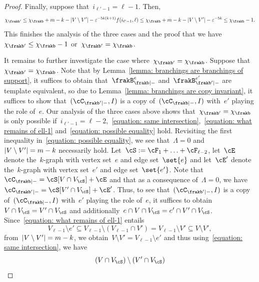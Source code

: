 \documentclass[11pt]{amsart}
\newcommand{\eps}{\varepsilon}
\DeclarePairedDelimiter{\abs}{\lvert}{\rvert}
\newcommand{\om}{\mathord{-}}
\theoremstyle{definition}
\numberwithin{equation}{section}
\begin{document}
\begin{proof}
		Finally, suppose that~$i_{\ell'-1}=\ell-1$.
		Then,
		\begin{equation*}
			\chi_{\frakb'}
			\leq \chi_{\frakb}+m-k-\abs{V\setminus V'}-\eps^{-5k(k+1)}f(i_{\ell'-1},\ell)
			\leq \chi_{\frakb}+m-k-\abs{V\setminus V'} -\eps^{-5k}
			\leq \chi_{\frakb}-1.
		\end{equation*}
		This finishes the analysis of the three cases and the proof that we have~$\chi_{\frakb'}\leq\chi_{\frakb}-1$ or~$\chi_{\frakb'}=\chi_{\frakb}$.
		
		It remains to further investigate the case where~$\chi_{\frakb'}=\chi_{\frakb}$.
		Suppose that~$\chi_{\frakb'}=\chi_{\frakb}$.
		Note that by Lemma~\ref{lemma: branchings are branchings of support}, it suffices to obtain that~$\frakB^e_{\frakb|\om}$ and~$\frakB^{e'}_{\frakb'|\om}$ are template equivalent, so due to Lemma~\ref{lemma: branchings are copy invariant}, it suffices to show that~$(\cC_{\frakb'|\om},I)$ is a copy of~$(\cC_{\frakb|\om},I)$ with~$e'$ playing the role of~$e$.
		Our analysis of the three cases above shows that~$\chi_{\frakb'}=\chi_{\frakb}$ is only possible if~$i_{\ell'-1}=\ell-2$,~\eqref{equation: same intersection},~\eqref{equation: what remains of ell-1} and~\eqref{equation: possible equality} hold.
		Revisiting the first inequality in~\eqref{equation: possible equality}, we see that~$\Lambda=0$ and~$\abs{V\setminus V'}=m-k$ necessarily hold.
		Let~$\cS:=\cF_1+\ldots+\cF_{\ell-2}$, let~$\cE$ denote the~$k$-graph with vertex set~$e$ and edge set~$\set{e}$ and let~$\cE'$ denote the~$k$-graph with vertex set~$e'$ and edge set~$\set{e'}$.
		Note that~$\cC_{\frakb|\om}=\cS[V\cap V_\cS]+\cE$ and that as a consequence of~$\Lambda=0$, we have~$\cC_{\frakb'|\om}=\cS[V'\cap V_\cS]+\cE'$.
		Thus, to see that~$(\cC_{\frakb'|\om},I)$ is a copy of~$(\cC_{\frakb|\om},I)$ with~$e'$ playing the role of~$e$, it suffices to obtain~$V\cap V_\cS=V'\cap V_\cS$ and additionally~$e\cap V\cap V_\cS=e'\cap V'\cap V_\cS$.
		Since~\eqref{equation: what remains of ell-1} entails
		\begin{equation*}
			V_{\ell-1}\setminus e'
			\subseteq V_{\ell-1}\setminus (V_{\ell-1}\cap V')
			=V_{\ell-1}\setminus V'
			\subseteq V\setminus V',
		\end{equation*}
		from~$\abs{V\setminus V'}=m-k$, we obtain~$V\setminus V'=V_{\ell-1}\setminus e'$ and thus using~\eqref{equation: same intersection}, we have
		\begin{equation*}
			\begin{aligned}
				(V\cap V_\cS)\setminus (V'\cap V_\cS)

\end{aligned}
\end{equation*}
\end{proof}
\end{document}
